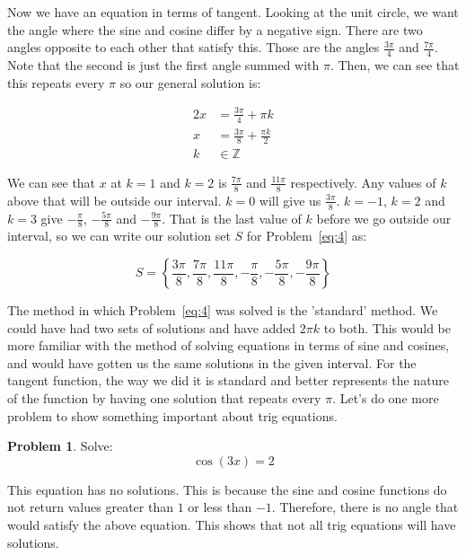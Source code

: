 \documentclass[12pt]{article}
\theoremstyle{definition}
\newtheorem{problem}{Problem}
\begin{document}
Now we have an equation in terms of tangent.
Looking at the unit circle, we want the angle where the sine and cosine differ by a negative sign.
There are two angles opposite to each other that satisfy this.
Those are the angles $\frac{3\pi}{4}$ and $\frac{7\pi}{4}$.
Note that the second is just the first angle summed with $\pi$.
Then, we can see that this repeats every $\pi$ so our general solution is:

\begin{align}
    2x & = \frac{3\pi}{4} + \pi k           \\
    x  & = \frac{3\pi}{8} + \frac{\pi k}{2} \\
    k  & \in \mathbb{Z}
\end{align}

We can see that $x$ at $k=1$ and $k=2$ is $\frac{7\pi}{8}$ and $\frac{11\pi}{8}$ respectively.
Any values of $k$ above that will be outside our interval.
$k=0$ will give us $\frac{3\pi}{8}$.
$k=-1$, $k=2$ and $k=3$ give $-\frac{\pi}{8}$, $-\frac{5\pi}{8}$ and $-\frac{9\pi}{8}$.
That is the last value of $k$ before we go outside our interval, so we can write our solution set $S$ for Problem~\eqref{eq:4} as:

\begin{equation}
    S = \left\{ \frac{3\pi}{8}, \frac{7\pi}{8}, \frac{11\pi}{8}, -\frac{\pi}{8}, -\frac{5\pi}{8}, -\frac{9\pi}{8} \right\}
\end{equation}

The method in which Problem~\eqref{eq:4} was solved is the 'standard' method.
We could have had two sets of solutions and have added $2\pi k$ to both.
This would be more familiar with the method of solving equations in terms of sine and cosines, and would have gotten us the same solutions in the given interval.
For the tangent function, the way we did it is standard and better represents the nature of the function by having one solution that repeats every $\pi$.
Let's do one more problem to show something important about trig equations.


\begin{problem}
Solve:
\begin{equation*}
    \cos(3x) = 2 \label{eq:5}
\end{equation*}
\end{problem}

This equation has no solutions.
This is because the sine and cosine functions do not return values greater than $1$ or less than $-1$.
Therefore, there is no angle that would satisfy the above equation.
This shows that not all trig equations will have solutions.
\end{document}
